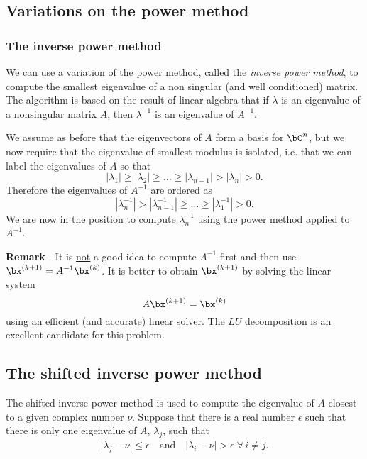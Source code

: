 \subsection{Variations on the power method}

\subsubsection{The inverse power method}

We can use a variation of the power method, called the \textit{inverse
power method}, to compute the smallest eigenvalue of a non singular
(and well conditioned) matrix.  The algorithm is based on the result
of linear algebra that if $\lambda$ is an eigenvalue of a nonsingular
matrix $A$, then $\lambda^{-1}$ is an eigenvalue of $A^{-1}$.

We assume as before that the eigenvectors of $A$ form a basis for
$\bC^n$, but we now require that the eigenvalue of smallest modulus is
isolated, i.e. that we can label the eigenvalues of $A$ so that
%
\begin{equation*}
  |\lambda_1| \ge |\lambda_2| \ge \ldots \ge |\lambda_{n-1}| > 
  |\lambda_n| > 0 .
\end{equation*}
%
Therefore the eigenvalues of $A^{-1}$ are ordered as
%
\begin{equation*}
  |\lambda_n^{-1}| > |\lambda_{n-1}^{-1}| \ge \ldots \ge 
  |\lambda_{1}^{-1}| > 0 .
\end{equation*}
%
We are now in the position to compute $\lambda_n^{-1}$ using the power
method applied to $A^{-1}$.

\smallskip

\noindent
\textbf{Remark} - It is \underline{not} a good idea to compute
$A^{-1}$ first and then use $\bx^{(k+1)} = A^{-1} \bx^{(k)}$.   It is
better to obtain $\bx^{(k+1)}$ by solving the linear system
%
\begin{equation*}
  A \bx^{(k+1)} = \bx^{(k)} 
\end{equation*}
%
using an efficient (and accurate) linear solver.   The $LU$
decomposition is an excellent candidate for this problem.

\subsection{The shifted inverse power method}

The shifted inverse power method is used to compute the eigenvalue of
$A$ closest to a given complex number $\nu$.   Suppose that there is a
real number $\epsilon$ such that there is only one eigenvalue of $A$, 
$\lambda_j$, such that
%
\begin{equation}
  |\lambda_j - \nu| \le \epsilon \quad \text{and} \quad
  |\lambda_i - \nu| > \epsilon \; \forall \, i \ne j.
  \label{eq:Ev10}
\end{equation}

